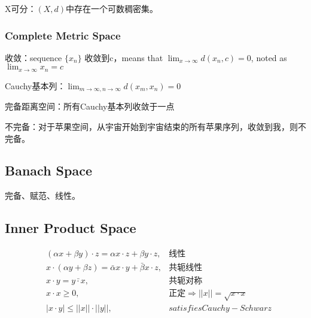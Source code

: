 \documentclass[UTF8]{../../09-Mathematics}
\begin{document}
\begin{definition}
    X可分：$(X,d)$中存在一个可数稠密集。
\end{definition}


\subsubsection{Complete Metric Space}

\begin{definition}
    收敛：sequence $\{ x_n \}$ 收敛到c，means that $\lim_{x \to \infty} d(x_n, c) = 0$, noted as $\lim_{x \to \infty} x_n = c $
\end{definition}

\begin{definition}
    Cauchy基本列：$\lim_{m \to \infty,n \to \infty}d(x_m, x_n)=0  $
\end{definition}

\begin{definition}
    完备距离空间：所有Cauchy基本列收敛于一点
\end{definition}

\begin{definition}
  不完备：对于苹果空间，从宇宙开始到宇宙结束的所有苹果序列，收敛到我，则不完备。
\end{definition}

\subsection{Banach Space}

完备、赋范、线性。


\subsection{Inner Product Space}

\begin{equation}%
\begin{aligned}
  &(\alpha x + \beta y ) \cdot z = \alpha x \cdot z + \beta y \cdot z, &   \mbox{线性}\\
  &x \cdot (\alpha y + \beta z) = \bar{ \alpha}    x \cdot y + \bar{ \beta}    x \cdot z,&   \mbox{共轭线性}\\
  &x \cdot y = \bar{ y \cdot x}, &   \mbox{共轭对称}\\
  &x \cdot x \geqslant 0 , &\mbox{正定} \Rightarrow || x || = \sqrt{x \cdot x} \\
  &|x \cdot y| \leqslant || x || \cdot || y ||, &satisfies  Cauchy-Schwarz \\
\end{aligned}
\end{equation}
 
\end{document}
